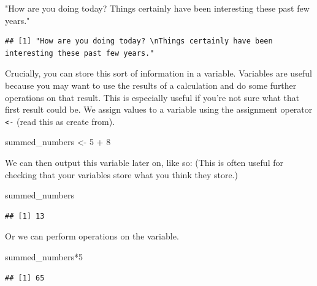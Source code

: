 \documentclass[
]{book}
\newenvironment{Shaded}{\begin{snugshade}}{\end{snugshade}}
\newcommand{\DecValTok}[1]{\textcolor[rgb]{0.00,0.00,0.81}{#1}}
\newcommand{\NormalTok}[1]{#1}
\newcommand{\OtherTok}[1]{\textcolor[rgb]{0.56,0.35,0.01}{#1}}
\newcommand{\SpecialCharTok}[1]{\textcolor[rgb]{0.00,0.00,0.00}{#1}}
\newcommand{\StringTok}[1]{\textcolor[rgb]{0.31,0.60,0.02}{#1}}
\begin{document}
\begin{Shaded}
\begin{Highlighting}[]
\StringTok{"How are you doing today? }
\StringTok{Things certainly have been interesting these past few years."}
\end{Highlighting}
\end{Shaded}

\begin{verbatim}
## [1] "How are you doing today? \nThings certainly have been interesting these past few years."
\end{verbatim}

Crucially, you can store this sort of information in a variable. Variables are useful because you may want to use the results of a calculation and do some further operations on that result. This is especially useful if you're not sure what that first result could be. We assign values to a variable using the assignment operator \texttt{\textless{}-} (read this as create from).

\begin{Shaded}
\begin{Highlighting}[]
\NormalTok{summed\_numbers }\OtherTok{\textless{}{-}} \DecValTok{5} \SpecialCharTok{+} \DecValTok{8}
\end{Highlighting}
\end{Shaded}

We can then output this variable later on, like so: (This is often useful for checking that your variables store what you think they store.)

\begin{Shaded}
\begin{Highlighting}[]
\NormalTok{summed\_numbers}
\end{Highlighting}
\end{Shaded}

\begin{verbatim}
## [1] 13
\end{verbatim}

Or we can perform operations on the variable.

\begin{Shaded}
\begin{Highlighting}[]
\NormalTok{summed\_numbers}\SpecialCharTok{*}\DecValTok{5}
\end{Highlighting}
\end{Shaded}

\begin{verbatim}
## [1] 65
\end{verbatim}
\end{document}
